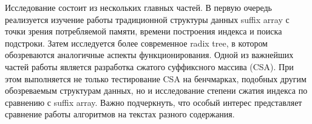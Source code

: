 
Исследование состоит из нескольких главных частей. В первую очередь реализуется изучение работы традиционной структуры
данных suffix array с точки зрения потребляемой памяти, времени построения индекса и поиска подстроки.
Затем исследуется более современное radix tree, в котором обозреваются аналогичные аспекты функционирования.
Одной из важнейших частей работы является разработка сжатого суффиксного массива (CSA).
При этом выполняется не только тестирование CSA на бенчмарках, подобных другим обозреваемым структурам данных,
но и исследование степени сжатия индекса по сравнению с suffix array.
Важно подчеркнуть, что особый интерес представляет сравнение работы алгоритмов на текстах разного содержания.